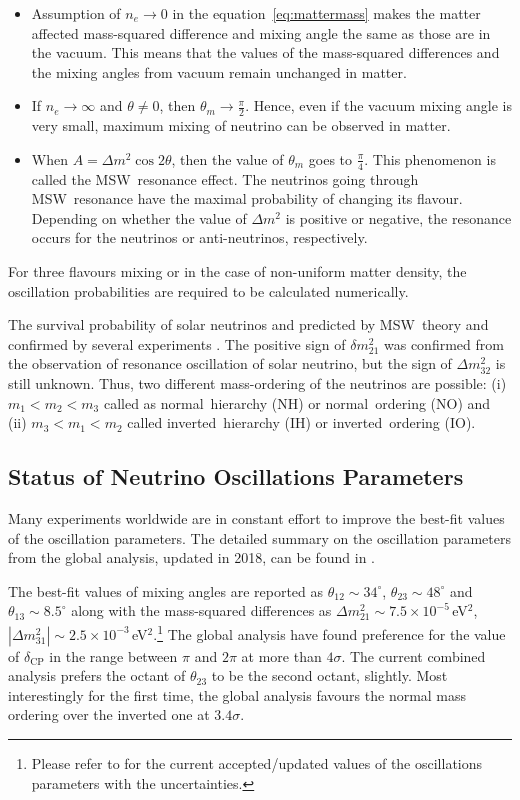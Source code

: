 \begin{itemize}\itemsep -4pt
\item Assumption of $n_{e}\rightarrow 0$ in the equation~\ref{eq:mattermass}
  makes the matter affected mass-squared difference and mixing angle the same
  as those are in the vacuum. This means that the values of the mass-squared
  differences and the mixing angles from vacuum remain unchanged in matter.
\item If $n_{e}\rightarrow\infty$ and $\theta\neq 0$, then
  $\theta_{m}\rightarrow\frac{\pi}{2}$. Hence, even if the vacuum mixing angle
  is very small, maximum mixing of neutrino can be observed in matter.
\item When $A = \Delta m^{2}\cos 2\theta$, then the value of $\theta_{m}$ goes
  to $\frac{\pi}{4}$. This phenomenon is called the MSW~resonance effect.
  The neutrinos going through MSW~resonance have the maximal probability of
  changing its flavour. Depending on whether the value of $\Delta m^{2}$ is
  positive or negative, the resonance occurs for the neutrinos or
  anti-neutrinos, respectively.
\end{itemize}
For three flavours mixing or in the case of non-uniform matter density, the oscillation probabilities are required to be calculated numerically.

The survival probability of solar neutrinos and predicted by MSW~theory
and confirmed by several experiments
\cite{homestake,gallex,sage,superk,sno,kamland}.
The positive sign of $\delta m^2_{21}$ was confirmed from the
observation of resonance oscillation of solar neutrino, but the sign of
$\Delta m_{32}^{2}$ is still unknown.
Thus, two different mass-ordering of the neutrinos are possible:
(i) $m_{1}<m_{2}<m_{3}$ called as normal~hierarchy (NH) or
normal~ordering (NO) and (ii) $m_{3}<m_{1}<m_{2}$ called
inverted~hierarchy (IH) or inverted~ordering (IO).


\subsection{Status of Neutrino Oscillations Parameters}
Many experiments worldwide are in constant effort to improve the
best-fit values of the oscillation parameters. The detailed summary
on the oscillation parameters from the global analysis, updated in
2018, can be found in \cite{neutrinostatus}.

The best-fit values of mixing angles are reported as
$\theta_{12}\sim 34^{\circ}$, $\theta_{23}\sim 48^{\circ}$ and
$\theta_{13}\sim 8.5^{\circ}$ along with the mass-squared differences as
$\Delta m^2_{21}\sim 7.5\times 10^{-5}$\,eV$^{2}$,
$\left|\Delta m^2_{31}\right|\sim 2.5\times 10^{-3}$\,eV$^{2}$.\footnote{Please refer to \cite{neutrinostatus} for the current accepted/updated values of the oscillations parameters with the uncertainties.}
The global analysis have found preference for the value of
$\delta_{\mathrm{CP}}$ in the range between $\pi$ and $2\pi$ at more than
$4\sigma$\cite{neutrinostatus}. The current combined analysis prefers
the octant of $\theta_{23}$ to be the second octant, slightly. Most
interestingly for the first time, the global analysis favours the
normal mass ordering over the inverted one at
$3.4\sigma$\cite{neutrinostatus}.


